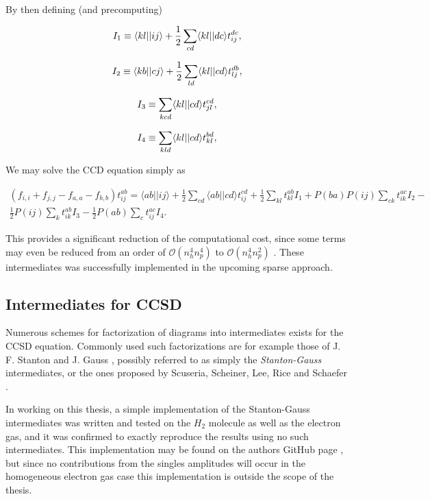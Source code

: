 By then defining (and precomputing)

\begin{equation}
I_1 \equiv \langle kl \vert \vert ij \rangle   + \frac{1}{2} \sum_{cd}   \langle kl \vert \vert dc \rangle t_{ij}^{dc},  \\
\end{equation}

\begin{equation}
I_2 \equiv \langle kb \vert \vert cj \rangle  + \frac{1}{2} \sum_{ld} \langle kl \vert \vert cd \rangle t_{lj}^{db},  \\
\end{equation}

\begin{equation}
I_3 \equiv \sum_{kcd} \langle kl \vert \vert cd \rangle t^{cd}_{jl},  \\
\end{equation}

\begin{equation}
I_4 \equiv \sum_{kld} \langle kl \vert \vert cd \rangle t^{bd}_{kl},  \\
\end{equation}

We may solve the CCD equation simply as

\begin{multline}
(f_{i,i} + f_{j,j} - f_{a,a} - f_{b,b})t^{ab}_{ij} =\langle ab \vert \vert ij \rangle + 
\frac{1}{2} \sum_{cd} \langle ab \vert \vert cd \rangle t_{ij}^{cd} +
\frac{1}{2} \sum_{kl} t^{ab}_{kl} I_1 +
P(ba)P(ij) \sum_{ck} t_{ik}^{ac} I_2 - \\
\frac{1}{2}P(ij) \sum_k t^{ab}_{ik} I_3 - 
\frac{1}{2}P(ab) \sum_c t^{ac}_{ij} I_4.
\end{multline}

This provides a significant reduction of the computational cost, since some terms may even be reduced from an order of $\mathcal{O}(n_h^4n_p^4)$ to  $\mathcal{O}(n_h^4n_p^2)$ \cite{Baardsen2014}. These intermediates was successfully implemented in the upcoming sparse approach.

\subsection{Intermediates for CCSD}

Numerous schemes for factorization of diagrams into intermediates exists for the CCSD equation.  Commonly used such factorizations are for example those of  J. F. Stanton and J. Gauss \cite{Solomonik2013}, possibly referred to as simply the \emph{Stanton-Gauss} intermediates, or the ones proposed by Scuseria, Scheiner, Lee, Rice and Schaefer \cite{scuseria1987}. 

In working on this thesis, a simple implementation of the Stanton-Gauss intermediates was written and tested on the $H_2$ molecule as well as the electron gas, and it was confirmed to exactly reproduce the results using no such intermediates. This implementation may be found on the authors GitHub page \cite{fermicc}, but since no contributions from the singles amplitudes will occur in the homogeneous electron gas case \cite{Baardsen2014} this implementation is outside the scope of the thesis. 


